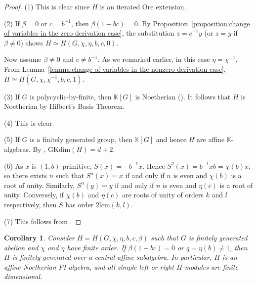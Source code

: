 \documentclass[11pt, twoside]{amsart}
\newtheorem{corollary}[theorem]{Corollary}
\theoremstyle{definition}
\newcommand{\KK}{\mathbb{K}}
\begin{document}
\begin{proof}
    (1) This is clear since $H$ is an iterated Ore extension.

    (2) If $\beta = 0$ or $c = b^{-1}$, then $\beta(1-bc) = 0$. By Proposition~\ref{proposition:change of variables in the zero derivation case}, the substitution $z = c^{-1}y$ (or $z=y$ if $\beta \neq 0$) shows $H \simeq H(G, \chi, \eta, b, c, 0)$. 
    
    Now assume $\beta \neq 0$ and $c \neq b^{-1}$. As we remarked earlier, in this case $\eta = \chi^{-1}$. From Lemma~\ref{lemma:change of variables in the nonzero derivation case}, $H \simeq H(G, \chi, \chi^{-1}, b, c, 1)$.

    (3) If $G$ is polycyclic-by-finite, then $\KK[G]$ is Noetherian (\cite[1.5.12]{McConnell-Robson}). It follows that $H$ is Noetherian by Hilbert's Basis Theorem.

    (4) This is clear.

    (5) If $G$ is a finitely generated group, then $\KK[G]$ and hence $H$ are affine $\KK$-algebras. By \cite[Theorem 2.6]{Brown-O'Hagan-Zhang}, $\mathrm{GKdim}(H) = d + 2$.

    (6) As $x$ is $(1, b)$-primitive, $S(x) = -b^{-1}x$. Hence $S^{2}(x) = b^{-1}xb = \chi(b)x$, so there exists $n$ such that $S^n(x) = x$ if and only if $n$ is even and $\chi(b)$ is a root of unity. Similarly, $S^n(y) = y$ if and only if $n$ is even and $\eta(c)$ is a root of unity. Conversely, if $\chi(b)$ and $\eta(c)$ are roots of unity of orders $k$ and $l$ respectively, then $S$ has order $2\mathrm{lcm}(k,l)$.

    (7) This follows from \cite[Proposition 2.5]{Brown-O'Hagan-Zhang}.
\end{proof}
%
\begin{corollary}
    Consider $H = H(G, \chi, \eta, b, c, \beta)$ such that $G$ is finitely generated abelian and $\chi$ and $\eta$ have finite order. If  $\beta(1-bc)=0$  or $q = \eta(b) \neq 1$, then $H$ is finitely generated over a central affine subalgebra. In particular, $H$ is an affine Noetherian PI-algebra, and all simple left or right $H$-modules are finite dimensional.
\end{corollary}
\end{document}
